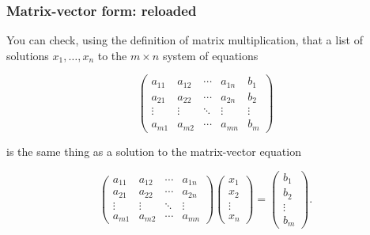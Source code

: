 \begin{frame}

\frametitle{Matrix-vector form: reloaded}
\label{matrix-vectorform:reloaded}

You can check, using the definition of matrix multiplication, that a list of solutions $ x_1, \ldots, x_n $ to the $ m \times n $ system of equations

    \[
    \begin{pmatrix}
        a_{11} & a_{12} & \cdots & a_{1n} & b_1 \\
        a_{21} & a_{22} & \cdots & a_{2n} & b_2 \\
        \vdots & \vdots & \ddots & \vdots & \vdots \\
        a_{m1} & a_{m2} & \cdots & a_{mn} & b_m 
    \end{pmatrix}
    \]

is the same thing as a solution to the matrix-vector equation

    \[
    \begin{pmatrix}
        a_{11} & a_{12} & \cdots & a_{1n} \\
        a_{21} & a_{22} & \cdots & a_{2n} \\
        \vdots & \vdots & \ddots & \vdots \\
        a_{m1} & a_{m2} & \cdots & a_{mn} 
    \end{pmatrix}
    \begin{pmatrix}
        x_1 \\ x_2 \\ \vdots \\ x_n
    \end{pmatrix} = \begin{pmatrix}
        b_1 \\ b_2 \\ \vdots \\ b_m
    \end{pmatrix}.
    \]


\end{frame}

